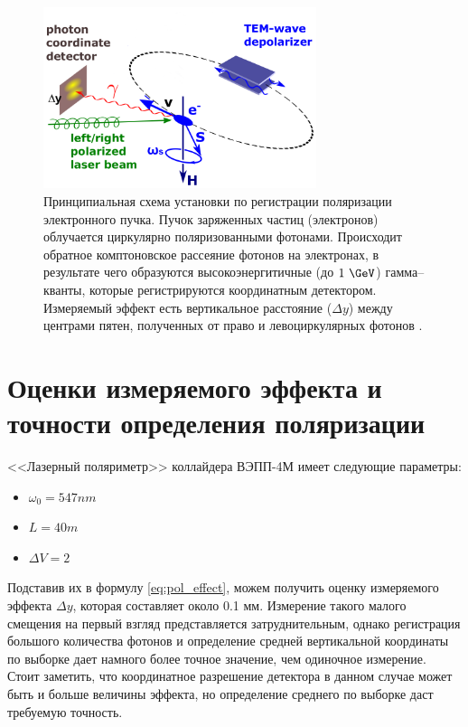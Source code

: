 \begin{figure}[H]
	\begin{center}
		\includegraphics[width = 8cm]{img/mrd-lsrp.png}
		\caption{Принципиальная схема установки по регистрации поляризации электронного пучка. Пучок заряженных частиц (электронов) облучается циркулярно поляризованными фотонами. Происходит обратное комптоновское рассеяние фотонов на электронах, в результате чего образуются высокоэнергитичные (до $1~\GeV$) гамма--кванты, которые регистрируются координатным детектором. Измеряемый эффект есть вертикальное расстояние ($\Delta y$) между центрами пятен, полученных от право и левоциркулярных фотонов .}
		\label{fig:laser_polarimeter_scheme}
	\end{center}
\end{figure}
\vspace{-20pt}
\section{Оценки измеряемого эффекта и точности определения поляризации }
<<Лазерный поляриметр>> коллайдера ВЭПП-4М имеет следующие параметры: 
\begin{itemize}
	\item $\omega_0 = 547 nm$ 
	\item $L = 40 m$
	\item $\Delta V = 2$
\end{itemize}
Подставив их в формулу \ref{eq:pol_effect}, можем получить оценку измеряемого эффекта $\Delta y$, которая составляет около  0.1 мм. Измерение такого малого смещения на первый взгляд представляется затруднительным, однако регистрация большого количества фотонов и определение средней вертикальной координаты по выборке дает намного более точное значение, чем одиночное измерение. Стоит заметить, что координатное разрешение детектора в данном случае может быть и больше величины эффекта, но определение среднего по выборке даст требуемую точность. 